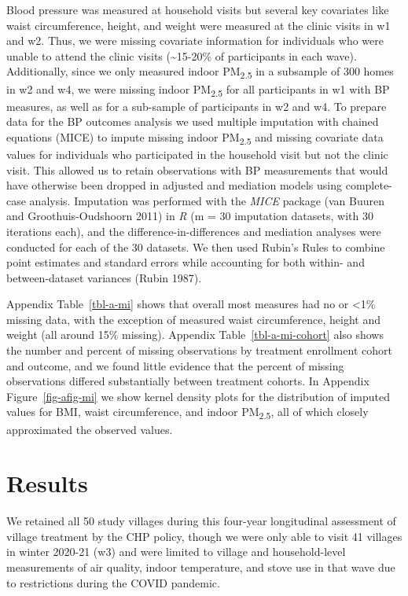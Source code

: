 \documentclass[
  letterpaper,
  DIV=11,
  numbers=noendperiod]{scrartcl}
\begin{document}
Blood pressure was measured at household visits but several key
covariates like waist circumference, height, and weight were measured at
the clinic visits in w1 and w2. Thus, we were missing covariate
information for individuals who were unable to attend the clinic visits
(\textasciitilde15-20\% of participants in each wave). Additionally,
since we only measured indoor PM\textsubscript{2.5} in a subsample of
300 homes in w2 and w4, we were missing indoor PM\textsubscript{2.5} for
all participants in w1 with BP measures, as well as for a sub-sample of
participants in w2 and w4. To prepare data for the BP outcomes analysis
we used multiple imputation with chained equations (MICE) to impute
missing indoor PM\textsubscript{2.5} and missing covariate data values
for individuals who participated in the household visit but not the
clinic visit. This allowed us to retain observations with BP
measurements that would have otherwise been dropped in adjusted and
mediation models using complete-case analysis. Imputation was performed
with the \emph{MICE} package (van Buuren and Groothuis-Oudshoorn 2011)
in \emph{R} (m = 30 imputation datasets, with 30 iterations each), and
the difference-in-differences and mediation analyses were conducted for
each of the 30 datasets. We then used Rubin's Rules to combine point
estimates and standard errors while accounting for both within- and
between-dataset variances (Rubin 1987).

Appendix  Table~\ref{tbl-a-mi} shows that overall
most measures had no or \textless1\% missing data, with the exception of
measured waist circumference, height and weight (all around 15\%
missing). Appendix Table~\ref{tbl-a-mi-cohort} also shows the number and
percent of missing observations by treatment enrollment cohort and
outcome, and we found little evidence that the percent of missing
observations differed substantially between treatment cohorts. In
Appendix Figure~\ref{fig-afig-mi} we show kernel density plots for the
distribution of imputed values for BMI, waist circumference, and indoor
PM\textsubscript{2.5}, all of which closely approximated the observed
values.

\section{Results}\label{results-1}

We retained all 50 study villages during this four-year longitudinal
assessment of village treatment by the CHP policy, though we were only
able to visit 41 villages in winter 2020-21 (w3) and were limited to
village and household-level measurements of air quality, indoor
temperature, and stove use in that wave due to restrictions during the
COVID pandemic.
\end{document}
